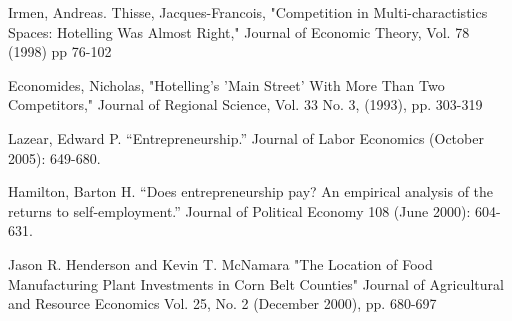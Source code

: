 \documentclass[11pt,a4paper]{article}\usepackage[]{graphicx}\usepackage[]{color}
\begin{document}
\begin{thebibliography}{99}
  Irmen, Andreas. Thisse, Jacques-Francois, "Competition in Multi-charactistics Spaces: Hotelling Was Almost Right," Journal of Economic Theory, Vol. 78 (1998) pp 76-102
  
  Economides, Nicholas, "Hotelling's 'Main Street' With More Than Two Competitors," Journal of Regional Science, Vol. 33 No. 3, (1993), pp. 303-319
  
  Lazear, Edward P. “Entrepreneurship.”  Journal of Labor Economics (October 2005): 649-680.

Hamilton, Barton H. “Does entrepreneurship pay? An empirical analysis of the returns to self-employment.”  Journal of Political Economy 108 (June 2000): 604-631.

Jason R. Henderson and Kevin T. McNamara "The Location of Food Manufacturing Plant Investments in Corn Belt Counties" Journal of Agricultural and Resource Economics
Vol. 25, No. 2 (December 2000), pp. 680-697 

\end{thebibliography}
\end{document}
